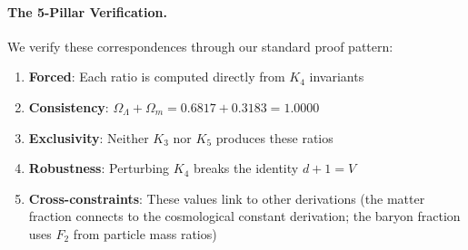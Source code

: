 \documentclass[11pt,a4paper]{book}
\begin{document}
\paragraph{The 5-Pillar Verification.}
We verify these correspondences through our standard proof pattern:
\begin{enumerate}
\item \textbf{Forced}: Each ratio is computed directly from $K_4$ invariants
\item \textbf{Consistency}: $\Omega_\Lambda + \Omega_m = 0.6817 + 0.3183 = 1.0000$
\item \textbf{Exclusivity}: Neither $K_3$ nor $K_5$ produces these ratios
\item \textbf{Robustness}: Perturbing $K_4$ breaks the identity $d + 1 = V$
\item \textbf{Cross-constraints}: These values link to other derivations 
      (the matter fraction connects to the cosmological constant derivation;
       the baryon fraction uses $F_2$ from particle mass ratios)
\end{enumerate}
\end{document}
